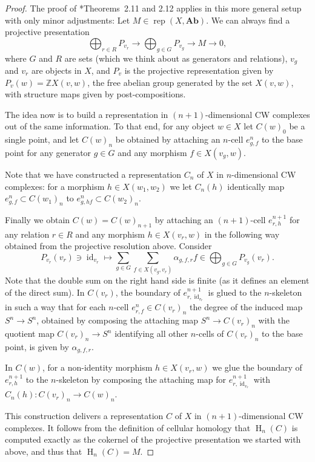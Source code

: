 \documentclass[a4paper]{amsart}
\theoremstyle{plain}
\theoremstyle{definition}
\theoremstyle{remark}
\newcommand{\Z}{\mathbb{Z}}
\DeclareMathOperator{\rep}{rep}
\begin{document}
\begin{proof}
The proof of \cite{harrington2019stratifying}*{Theorems~2.11 and 2.12} applies in this more general setup with only minor adjustments: Let \( M \in \rep(X, \mathbf{Ab}) \). We can always find a projective presentation
\[ \bigoplus_{r \in R} P_{v_r} \to \bigoplus_{g \in G} P_{v_g} \to M \to 0, \]
where \( G \) and \( R \) are sets (which we think about as generators and relations), \( v_g \) and \( v_r \) are objects in \( X \), and \( P_v \) is the projective representation given by \( P_v(w) = \Z X(v,w) \), the free abelian group generated by the set \( X(v,w) \), with structure maps given by post-compositions.

The idea now is to build a representation in \( (n+1) \)-dimensional CW complexes out of the same information. To that end, for any object \( w \in X \) let \( C(w)_0 \) be a single point, and let \( C(w)_n \) be obtained by attaching an \( n \)-cell \( e^n_{g, f} \) to the base point for any generator \( g \in G \) and any morphism \( f \in X(v_g,w) \).

Note that we have constructed a representation \( C_n \) of \( X \) in \( n \)-dimensional CW complexes: for a morphism \( h \in X(w_1, w_2) \) we let \( C_n(h) \) identically map \( e^n_{g, f} \subset C(w_1)_n \) to \( e^n_{g, hf} \subset C(w_2)_n \).

Finally we obtain \( C(w) = C(w)_{n+1} \) by attaching an \( (n+1) \)-cell \( e^{n+1}_{r, h} \) for any relation \( r \in R \) and any morphism \( h \in X(v_r, w) \) in the following way obtained from the projective resolution above.
Consider
\[ P_{v_r}(v_r) \ni \operatorname{id}_{v_r} \mapsto \sum_{g \in G} \sum_{f \in X(v_g, v_r)} \alpha_{g,f,r} f \in \bigoplus_{g \in G} P_{v_g}(v_r). \]
Note that the double sum on the right hand side is finite (as it defines an element of the direct sum). 
In \( C(v_r) \), the boundary of \( e^{n+1}_{r, \operatorname{id}_{v_r}} \) is glued to the \( n \)-skeleton in such a way that for each \( n \)-cell \( e^n_{r, f} \in C(v_r)_n \) the degree of the induced map \( S^n \to S^n \), obtained by composing the attaching map \( S^n \to C(v_r)_n \) with the quotient map \( C(v_r)_n \to S^n \) identifying all other \(n\)-cells of \( C(v_r)_n \) to the base point, is given by \( \alpha_{g,f,r} \).

In \( C(w) \), for a non-identity morphism \( h \in X(v_r, w) \) we glue the boundary of \( e^{n+1}_{r, h} \) to the \( n \)-skeleton by composing the attaching map for \( e^{n+1}_{r, \operatorname{id}_{v_r}} \) with \( C_n(h) \colon C(v_r)_n \to C(w)_n \).

This construction delivers a representation \( C \) of \( X \) in \( (n+1) \)-dimensional CW complexes. It follows from the definition of cellular homology that \( \operatorname{H}_n(C) \) is computed exactly as the cokernel of the projective presentation we started with above, and thus that \( \operatorname{H}_n(C) = M \).
\end{proof}
\end{document}

